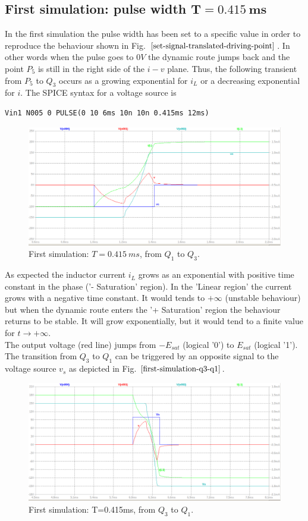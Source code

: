\documentclass[12pt,a4paper,tweside,onehalfspacing]{article}
\begin{document}
\subsection{First simulation: pulse width \texorpdfstring{$\bm{T=0.415\ ms}$}{} }
In the first simulation the pulse width has been set to a specific value in order to reproduce the behaviour shown in  Fig. $\ref{set-signal-translated-driving-point}$. In other words when the pulse goes to $0V$ the dynamic route jumps back and the point $P_5$ is still in the right side of the $i-v$ plane. Thus, the following transient from $P_5$ to $Q_3$ occurs as a growing exponential for $i_L$ or a decreasing exponential for $i$.
The SPICE syntax for a voltage source is
\begin{verbatim}
Vin1 N005 0 PULSE(0 10 6ms 10n 10n 0.415ms 12ms)
\end{verbatim}
%
\begin{figure}[!ht]
        \centering \includegraphics[width=0.8\columnwidth]{first-simulation-Q1-Q3.png}
        \caption{\label{first-simulation-q1-q3}First simulation: $T=0.415\ ms$, from $Q_1$ to $Q_3$.
        }
\end{figure}
%
As expected the inductor current $i_L$ grows as an exponential with positive time constant in the phase ('- Saturation' region). In the 'Linear region' the current grows with a negative time constant. It would tends to $+\infty$ (unstable behaviour) but when the dynamic route enters the '+ Saturation' region the behaviour returns to be stable. It will grow exponentially, but it would tend to a finite value for $t\rightarrow+\infty$.\\
The output voltage (red line) jumps from $-E_{sat}$ (logical '0') to $E_{sat}$ (logical '1').\\
The transition from $Q_3$ to $Q_1$ can be triggered by an opposite signal to the voltage source $v_s$ as depicted in Fig. $\ref{first-simulation-q3-q1}$.
%
\begin{figure}[!ht]
        \centering \includegraphics[width=0.8\columnwidth]{first-simulation-Q3-Q1.png}
        \caption{\label{first-simulation-q3-q1}First simulation: T=0.415ms, from $Q_3$ to $Q_1$.
        }
\end{figure}
%
\clearpage
%
\newpage
%
\end{document}
